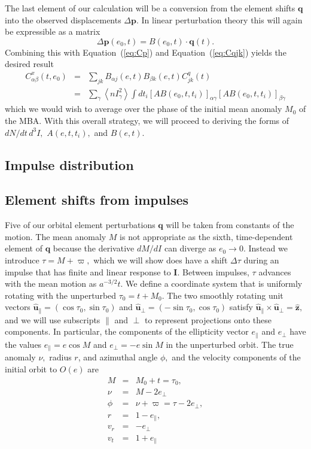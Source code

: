 \documentclass[linenumbers, onecolumn]{aastex631}
\newcommand{\eqq}[1]{Equation~(\ref{#1})}
\newcommand{\vecI}{\mathbf{I}}
\newcommand{\uhat}{\boldsymbol{\hat u}}
\newcommand{\zhat}{\mathbf{\hat z}}
\newcommand{\vecp}{\mathbf{p}}
\newcommand{\vecq}{\mathbf{q}}
\newcommand{\matA}{A}
\newcommand{\matB}{B}
\newcommand{\covm}{C}
\newcommand{\lop}{\varpi}
\begin{document}
The last element of our calculation will be a conversion from the element shifts $\vecq$ into the observed displacements $\Delta\vecp$.  In linear perturbation theory this will again be expressible as a matrix
\begin{equation}
  \Delta\vecp(e_0,t) = \matB(e_0,t) \cdot \vecq(t).
\label{eq:B}
\end{equation}
Combining this with \eqq{eq:Cp} and \eqq{eq:Cqjk} yields the desired result
\begin{eqnarray}
  \covm^x_{\alpha\beta}(t,e_0) & = & \sum_{jk} B_{\alpha j}(e,t) B_{\beta k}(e,t) \covm^q_{jk}(t) \nonumber \\
  & = & \sum_\gamma \left\langle nI_\gamma^2\right\rangle \int dt_i \left[AB(e_0,t,t_i)\right]_{\alpha\gamma}  \left[AB(e_0,t,t_i)\right]_{\beta\gamma} 
\label{eq:ABq}
\end{eqnarray}
which we would wish to average over the phase of the initial mean anomaly $M_0$ of the MBA.
With this overall strategy, we will proceed to deriving the forms of $dN/dt\,d^3I,$ $\matA(e,t,t_i),$ and $\matB(e,t).$ 

\subsection{Impulse distribution}

\subsection{Element shifts from impulses}

Five of our orbital element perturbations $\vecq$ will be taken from constants of the motion.  The mean anomaly $M$ is not appropriate as the sixth, time-dependent element of $\vecq$ because the derivative $dM/dI$ can diverge as $e_0\rightarrow 0.$ Instead we introduce $\tau = M+\lop,$ which we will show does have a shift $\Delta\tau$ during an impulse that has finite and linear response to $\vecI$.  Between impulses, $\tau$ advances with the mean motion as $a^{-3/2}t.$  We define a coordinate system that is uniformly rotating with the unperturbed $\tau_0=t+M_0.$ The two smoothly rotating unit vectors $\uhat_\parallel=(\cos \tau_0, \sin \tau_0)$ and
$\uhat_\perp=(-\sin \tau_0, \cos \tau_0)$ satisfy $\uhat_\parallel \times \uhat_\perp = \zhat,$ and we will use subscripts $\parallel$ and $\perp$ to represent projections onto these components.  In particular, the components of the ellipticity vector $e_\parallel$ and $e_\perp$ have the values $e_\parallel=e\cos M$ and $e_\perp=-e\sin M$ in the unperturbed orbit.
The true anomaly $\nu,$ radius $r$, and azimuthal angle $\phi,$ and the velocity components of the initial orbit to $O(e)$ are
\begin{eqnarray}
  M & = & M_0 + t = \tau_0,  \nonumber \\
  \nu & = & M - 2 e_\perp \nonumber \\
  \phi & = & \nu + \lop = \tau - 2e_\perp, \nonumber\\
  r & = & 1-e_\parallel, \nonumber \\
  v_r & = & -e_\perp \nonumber \\
  v_t & = & 1 + e_\parallel
            \label{eq:kepler}
\end{eqnarray}
\end{document}
